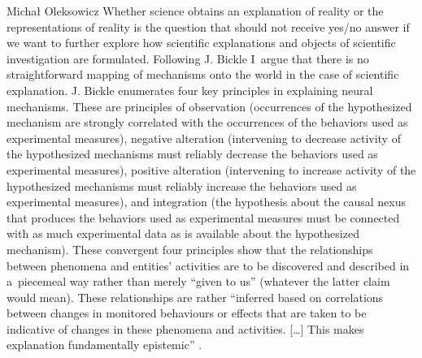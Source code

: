 \begin{artengenv}{Michał Oleksowicz}
Whether science obtains an explanation of reality or the representations of reality is the question that should not receive yes/no answer if we want to further explore how scientific explanations and objects of scientific investigation are formulated. Following J. Bickle I~argue that there is no straightforward mapping of mechanisms onto the world in the case of scientific explanation. J. Bickle
\parencite*[][]{hohwy_real_2008} %
 enumerates four key principles in explaining neural mechanisms. These are principles of observation (occurrences of the hypothesized mechanism are strongly correlated with the occurrences of the behaviors used as experimental measures), negative alteration (intervening to decrease activity of the hypothesized mechanisms must reliably decrease the behaviors used as experimental measures), positive alteration (intervening to increase activity of the hypothesized mechanisms must reliably increase the behaviors used as experimental measures), and integration (the hypothesis about the causal nexus that produces the behaviors used as experimental measures must be connected with as much experimental data as is available about the hypothesized mechanism). These convergent four principles show that the relationships between phenomena and entities' activities are to be discovered and described in a~piecemeal way rather than merely ``given to us'' (whatever the latter claim would mean). These relationships are rather ``inferred based on correlations between changes in monitored behaviours or effects that are taken to be indicative of changes in these phenomena and activities. […] This makes explanation fundamentally epistemic'' 
\parencite[][p.15]{van_eck_reconciling_2015}.%



\end{artengenv}
